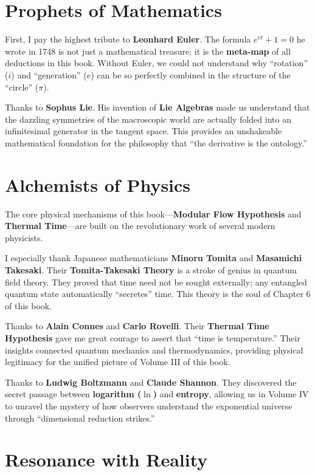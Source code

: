 \documentclass[11pt,a4paper,twoside]{book}
\begin{document}
\section{Prophets of Mathematics}

First, I pay the highest tribute to \textbf{Leonhard Euler}. The formula $e^{i\pi} + 1 = 0$ he wrote in 1748 is not just a mathematical treasure; it is the \textbf{meta-map} of all deductions in this book. Without Euler, we could not understand why ``rotation'' ($i$) and ``generation'' ($e$) can be so perfectly combined in the structure of the ``circle'' ($\pi$).

Thanks to \textbf{Sophus Lie}. His invention of \textbf{Lie Algebras} made us understand that the dazzling symmetries of the macroscopic world are actually folded into an infinitesimal generator in the tangent space. This provides an unshakeable mathematical foundation for the philosophy that ``the derivative is the ontology.''

\section{Alchemists of Physics}

The core physical mechanisms of this book---\textbf{Modular Flow Hypothesis} and \textbf{Thermal Time}---are built on the revolutionary work of several modern physicists.

I especially thank Japanese mathematicians \textbf{Minoru Tomita} and \textbf{Masamichi Takesaki}. Their \textbf{Tomita-Takesaki Theory} is a stroke of genius in quantum field theory. They proved that time need not be sought externally; any entangled quantum state automatically ``secretes'' time. This theory is the soul of Chapter 6 of this book.

Thanks to \textbf{Alain Connes} and \textbf{Carlo Rovelli}. Their \textbf{Thermal Time Hypothesis} gave me great courage to assert that ``time is temperature.'' Their insights connected quantum mechanics and thermodynamics, providing physical legitimacy for the unified picture of Volume III of this book.

Thanks to \textbf{Ludwig Boltzmann} and \textbf{Claude Shannon}. They discovered the secret passage between \textbf{logarithm ($\ln$)} and \textbf{entropy}, allowing us in Volume IV to unravel the mystery of how observers understand the exponential universe through ``dimensional reduction strikes.''

\section{Resonance with Reality}
\end{document}
